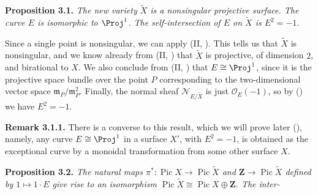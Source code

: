 {\medskip
\noindent\hypertarget{result-V-3.1}{}\textbf{Proposition 3.1.} \emph{The new variety $\widetilde X$ is a nonsingular projective surface. The curve $E$ is isomorphic to $\Proj^1$. The self-intersection of $E$ on $\widetilde X$ is $E^2=-1$.}

\Proof Since a single point is nonsingular, we can apply (II, ). This tells us that $\widetilde X$ is nonsingular, and we know already from (II, ) that $\widetilde X$ is projective, of dimension $2$, and birational to $X$. We also conclude from (II, ) that $E\cong\Proj^1$, since it is the projective space bundle over the point $P$ corresponding to the two-dimensional vector space $\mathfrak m_P/\mathfrak m_P^2$. Finally, the normal sheaf $\mathcal N_{E/\widetilde X}$ is just $\mathcal O_E(-1)$, so by () we have $E^2=-1$.

\medskip
\noindent\hypertarget{result-V-3.1.1}{}\textbf{Remark 3.1.1.} There is a converse to this result, which we will prove later (), namely, any curve $E\cong\Proj^1$ in a surface $X'$, with $E^2=-1$, is obtained as the exceptional curve by a monoidal transformation from some other surface $X$.

\medskip
\noindent\hypertarget{result-V-3.2}{}\textbf{Proposition 3.2.} \emph{The natural maps $\pi^*\colon\operatorname{Pic}X\to\operatorname{Pic}\widetilde X$ and $\mathbf Z\to\operatorname{Pic}\widetilde X$ defined by $1\mapsto1\cdot E$ give rise to an isomorphism $\operatorname{Pic}\widetilde X\cong\operatorname{Pic}X\oplus\mathbf Z$. The inter-}
}

